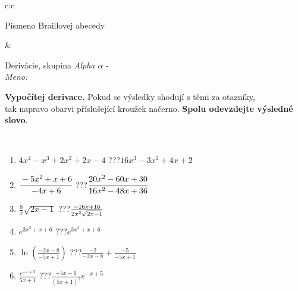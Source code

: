 \documentclass[10pt]{report}
\begin{document}
\begin{tabular}{c:c}
\begin{minipage}[c][104.5mm][t]{0.5\linewidth}
\begin{center}
\begin{minipage}{0.20\linewidth}
\begin{center}
{\small Písmeno Braillovej abecedy}
\end{center}
\end{minipage}
\end{center}
\end{minipage}
&
\begin{minipage}[c][104.5mm][t]{0.5\linewidth}
\begin{center}
\vspace{7mm}
{\huge Derivácie, skupina \textit{Alpha $\alpha$} -}\\[5mm]
\textit{Meno:}\phantom{xxxxxxxxxxxxxxxxxxxxxxxxxxxxxxxxxxxxxxxxxxxxxxxxxxxxxxxxxxxxxxxxx}\\[5mm]
\begin{minipage}{0.95\linewidth}
\begin{center}
\textbf{Vypočítej derivace.} Pokud se výsledky shodují s těmi za otazníky,\\tak napravo obarvi příslušející kroužek načerno. \textbf{Spolu odevzdejte výsledné slovo}.
\end{center}
\end{minipage}
\\[1mm]
\begin{minipage}{0.79\linewidth}
\begin{center}
\begin{varwidth}{\linewidth}
\begin{enumerate}
\normalsize
\item $4x^4-x^3+2x^2+2x-4$\quad \dotfill\; ???\;\dotfill \quad $16x^3-3x^2+4x+2$
\item $\cfrac{-5x^2+x+6}{-4x+6}$\quad \dotfill\; ???\;\dotfill \quad $\cfrac{20x^2-60x+30}{16x^2-48x+36}$
\item $\frac{8}{x}\sqrt{2x-1}$\quad \dotfill\; ???\;\dotfill \quad $\frac{-16x+16}{2x^2 \sqrt{\smash[b]{2x-1}}}$
\item $e^{3x^2+x+6}$\quad \dotfill\; ???\;\dotfill \quad $e^{3x^2+x+6}$
\item $\ln{\left(\frac{-2x-8}{-5x+1}\right)}$\quad \dotfill\; ???\;\dotfill \quad $\frac{-2}{-2x-8}+\frac{-5}{-5x+1}$
\item $\frac{e^{-x+5}}{5x+1}$\quad \dotfill\; ???\;\dotfill \quad $\frac{+5x-6}{(5x+1)^2}e^{-x+5}$
\end{enumerate}
\end{varwidth}
\end{center}
\end{minipage}
\begin{minipage}{0.20\linewidth}
\begin{center}

\end{center}
\end{minipage}
\end{center}
\end{minipage}
\end{tabular}
\end{document}
